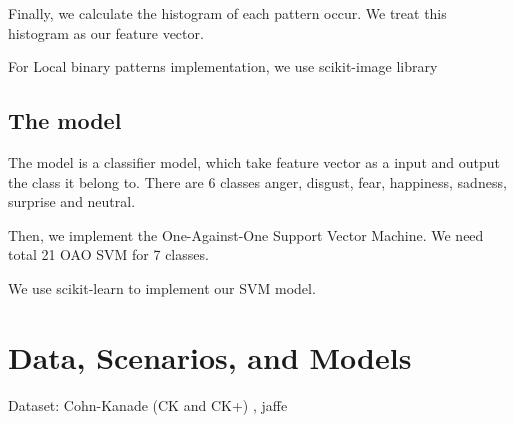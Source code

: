 \documentclass[a4paper, 12pt]{article}
\begin{document}
	Finally, we calculate the histogram of each pattern occur. We treat this histogram as our feature vector.
	
	For Local binary patterns implementation, we use scikit-image library \cite{van2014scikit}
	
	
	
		
\subsection{The model}
	The model is a classifier model, which take feature vector as a input and output the class it belong to. There are 6 classes anger, disgust, fear, happiness, sadness, surprise and neutral.
	
	Then, we implement the One-Against-One Support Vector Machine. We need total 21 OAO SVM for 7 classes.
	
	We use scikit-learn to \cite{pedregosa2011scikit} implement our SVM model. 
	

\section{Data, Scenarios, and Models}
Dataset: Cohn-Kanade (CK and CK+) \cite{5543262}, jaffe \cite{lyons1998japanese}





\end{document}
